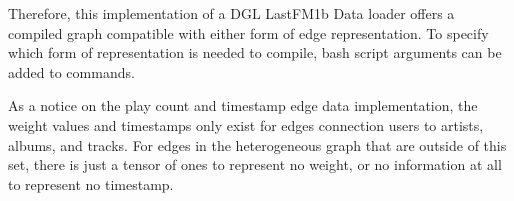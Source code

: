 Therefore, this implementation of a DGL LastFM1b Data loader offers a compiled graph compatible with either form of edge representation. To specify which form of representation is needed to compile, bash script arguments can be added to commands.






As a notice on the play count and timestamp edge data implementation, the weight values and timestamps only exist for edges connection users to artists, albums, and tracks. For edges in the heterogeneous graph that are outside of this set, there is just a tensor of ones to represent no weight, or no information at all to represent no timestamp.